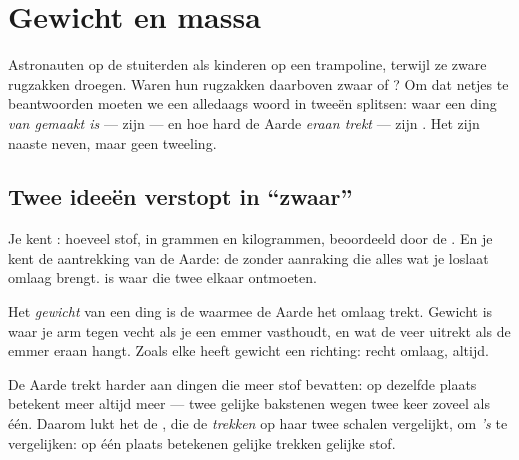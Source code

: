\chapter{Gewicht en massa}\label{ch:g4:weight-and-mass}

Astronauten op de  stuiterden als kinderen op een trampoline,
terwijl ze zware rugzakken droegen. Waren hun rugzakken daarboven zwaar
of ? Om dat netjes te beantwoorden moeten we een alledaags woord
in tweeën splitsen: waar een ding \emph{van gemaakt is} --- zijn
 --- en hoe hard de Aarde \emph{eraan trekt} --- zijn
. Het zijn naaste neven, maar geen tweeling.

\section{Twee ideeën verstopt in ``zwaar''}

Je kent : hoeveel stof, in grammen en kilogrammen, beoordeeld
door de . En je kent de aantrekking van de Aarde: de
 zonder aanraking die alles wat je loslaat omlaag brengt.
 is waar die twee elkaar ontmoeten.

\begin{definition}[Gewicht]\label{def:g4:weight-and-mass:weight}
Het \emph{gewicht} van een ding is de  waarmee de
Aarde het omlaag trekt. Gewicht is waar je arm tegen vecht als je een
emmer vasthoudt, en wat de veer uitrekt als de emmer eraan hangt. Zoals
elke  heeft gewicht een richting: recht omlaag, altijd.
\end{definition}

\begin{proposition}\label{prop:g4:weight-and-mass:morestuff}
De Aarde trekt harder aan dingen die meer stof bevatten: op dezelfde
plaats betekent meer  altijd meer  --- twee gelijke
bakstenen wegen twee keer zoveel als één. Daarom lukt het de
, die de \emph{trekken} op haar twee schalen
vergelijkt, om \emph{'s} te vergelijken: op één plaats betekenen
gelijke trekken gelijke stof.
\end{proposition}

